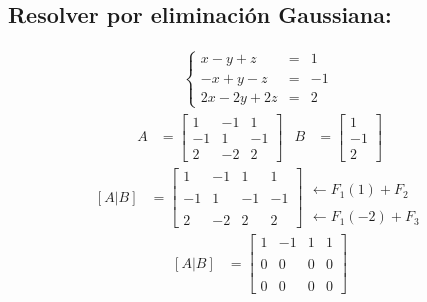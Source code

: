 \documentclass[10pt, a4paper]{article}
\begin{document}
\subsection{Resolver por eliminación Gaussiana:}
\begin{align*}
  \left\{
  \begin{array}{rcl}
    x-y+z &= &1\\
    -x+y-z &= &-1\\
    2x-2y+2z &= &2
  \end{array}
  \right.\
\end{align*}
  \begin{align*}
    A &= \begin{bmatrix}
      1 & -1 & 1\\
      -1 & 1 & -1\\
      2 & -2 & 2
    \end{bmatrix}&
    B &= \begin{bmatrix}
      1\\
      -1\\
      2
    \end{bmatrix}
  \end{align*}
  \begin{align*}
    \left[A|B\right]&=\left[
      \begin{array}{ccc|c}
        1 & -1 & 1 & 1 \\\\
        -1 & 1 & -1 & -1 \\\\
        2 & -2 & 2 & 2
      \end{array}
    \right]
    \begin{array}{r}
      \\\\
      \leftarrow F_1\left(1\right)+F_2 \\\\
      \leftarrow F_1\left(-2\right)+F_3
    \end{array}
  \end{align*}
  \begin{align*}
    \left[A|B\right]&=\left[
      \begin{array}{ccc|c}
        1 & -1 & 1 & 1 \\\\
        0 & 0 & 0 & 0 \\\\
        0 & 0 & 0 & 0
      \end{array}
    \right]
  \end{align*}
\end{document}

